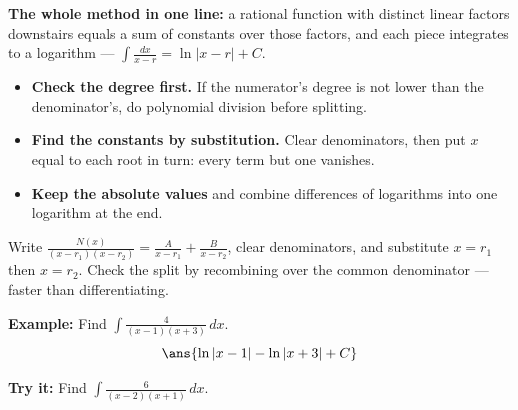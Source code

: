 \documentclass[12pt]{article}
\begin{document}

\begin{formulabox}
\textbf{The whole method in one line:} a rational function with distinct linear
factors downstairs equals a sum of constants over those factors, and each piece
integrates to a logarithm --- $\int \frac{dx}{x-r} = \ln|x-r| + C$.
\begin{itemize}[leftmargin=0.9cm, itemsep=1pt, topsep=1pt]
\item \textbf{Check the degree first.} If the numerator's degree is not lower
than the denominator's, do polynomial division before splitting.
\item \textbf{Find the constants by substitution.} Clear denominators, then put
$x$ equal to each root in turn: every term but one vanishes.
\item \textbf{Keep the absolute values} and combine differences of logarithms
into one logarithm at the end.
\end{itemize}
\end{formulabox}


\begin{formulabox}
Write $\frac{N(x)}{(x-r_1)(x-r_2)} = \frac{A}{x-r_1} + \frac{B}{x-r_2}$, clear
denominators, and substitute $x = r_1$ then $x = r_2$. Check the split by
recombining over the common denominator --- faster than differentiating.
\end{formulabox}

\begin{examplebox}
\textbf{Example:} Find $\displaystyle\int \frac{4}{(x-1)(x+3)}\,dx$.
\[ \ans{\ln|x-1| - \ln|x+3| + C} \]
\end{examplebox}

\begin{tryitbox}
\textbf{Try it:} Find $\displaystyle\int \frac{6}{(x-2)(x+1)}\,dx$.

\end{tryitbox}

\end{document}

